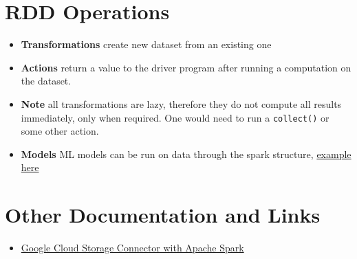 \documentclass[english]{article}
\begin{document}
\section{RDD Operations}
\begin{itemize}
\item \textbf{Transformations } create new dataset from an existing one
\item \textbf{Actions } return a value to the driver program after running a computation on the dataset.
\item \textbf{Note } all transformations are lazy, therefore they do not compute all results immediately, only when required. One would need to run a \verb"collect()" or some other action.
\item \textbf{Models } ML models can be run on data through the spark structure, \href{https://github.com/apache/spark/blob/master/examples/src/main/python/kmeans.py}{example here}
\end{itemize}

\section{Other Documentation and Links}
\begin{itemize}
\item \href{https://cloud.google.com/dataproc/docs/tutorials/gcs-connector-spark-tutorial}{Google Cloud Storage Connector with Apache Spark}
\end{itemize}
\end{document}
